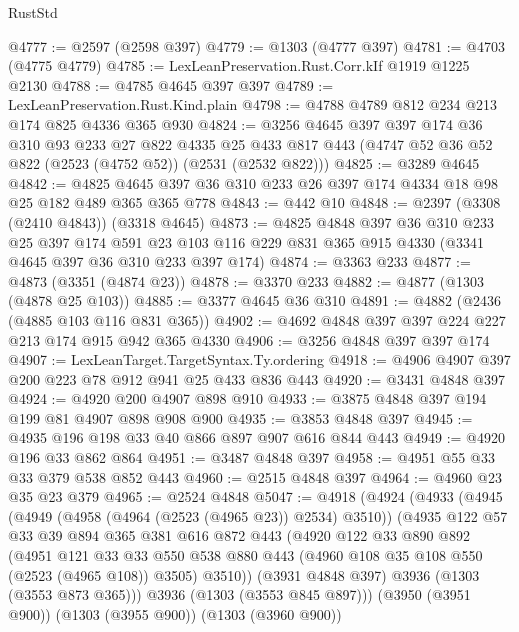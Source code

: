 \begin{lexlean}{RustStd}
\begin{coremodule}
@4777 := @2597 (@2598 @397)
@4779 := @1303 (@4777 @397)
@4781 := @4703 (@4775 @4779)
@4785 := LexLeanPreservation.Rust.Corr.kIf @1919 @1225 @2130
@4788 := @4785 @4645 @397 @397
@4789 := LexLeanPreservation.Rust.Kind.plain
@4798 := @4788 @4789 @812 @234 @213 @174 @825 @4336 @365 @930
@4824 := @3256
    @4645
    @397
    @397
    @174
    @36
    @310
    @93
    @233
    @27
    @822
    @4335
    @25
    @433
    @817
    @443
    (@4747 @52 @36 @52 @822 (@2523 (@4752 @52)) (@2531 (@2532 @822)))
@4825 := @3289 @4645
@4842 := @4825 @4645 @397 @36 @310 @233 @26 @397 @174 @4334 @18 @98 @25 @182 @489 @365 @365 @778
@4843 := @442 @10
@4848 := @2397 (@3308 (@2410 @4843)) (@3318 @4645)
@4873 := @4825
    @4848
    @397
    @36
    @310
    @233
    @25
    @397
    @174
    @591
    @23
    @103
    @116
    @229
    @831
    @365
    @915
    @4330
    (@3341 @4645 @397 @36 @310 @233 @397 @174)
@4874 := @3363 @233
@4877 := @4873 (@3351 (@4874 @23))
@4878 := @3370 @233
@4882 := @4877 (@1303 (@4878 @25 @103))
@4885 := @3377 @4645 @36 @310
@4891 := @4882 (@2436 (@4885 @103 @116 @831 @365))
@4902 := @4692 @4848 @397 @397 @224 @227 @213 @174 @915 @942 @365 @4330
@4906 := @3256 @4848 @397 @397 @174
@4907 := LexLeanTarget.TargetSyntax.Ty.ordering
@4918 := @4906 @4907 @397 @200 @223 @78 @912 @941 @25 @433 @836 @443
@4920 := @3431 @4848 @397
@4924 := @4920 @200 @4907 @898 @910
@4933 := @3875 @4848 @397 @194 @199 @81 @4907 @898 @908 @900
@4935 := @3853 @4848 @397
@4945 := @4935 @196 @198 @33 @40 @866 @897 @907 @616 @844 @443
@4949 := @4920 @196 @33 @862 @864
@4951 := @3487 @4848 @397
@4958 := @4951 @55 @33 @33 @379 @538 @852 @443
@4960 := @2515 @4848 @397
@4964 := @4960 @23 @35 @23 @379
@4965 := @2524 @4848
@5047 := @4918
    (@4924
      (@4933
        (@4945
          (@4949 (@4958 (@4964 (@2523 (@4965 @23)) @2534) @3510))
          (@4935
            @122
            @57
            @33
            @39
            @894
            @365
            @381
            @616
            @872
            @443
            (@4920
              @122
              @33
              @890
              @892
              (@4951
                @121
                @33
                @33
                @550
                @538
                @880
                @443
                (@4960 @108 @35 @108 @550 (@2523 (@4965 @108)) @3505)
                @3510))
            (@3931 @4848 @397)
            @3936
            (@1303 (@3553 @873 @365)))
          @3936
          (@1303 (@3553 @845 @897)))
        (@3950 (@3951 @900))
        (@1303 (@3955 @900))
        (@1303 (@3960 @900))

\end{coremodule}
\end{lexlean}
